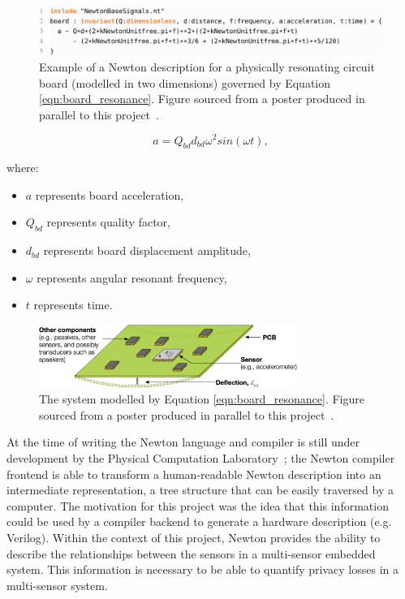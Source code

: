 \documentclass[12pt]{article}
\begin{document}
    \begin{figure}[H]
      \centering
      \includegraphics[width=\textwidth]{fig/newton_description.png}
      \caption{Example of a Newton description for a physically resonating circuit board (modelled in two dimensions) governed by Equation \ref{eqn:board_resonance}. Figure sourced from a poster produced in parallel to this project~\cite{eurosys_poster}.}
      \label{fig:newton_description}
    \end{figure}

    \begin{equation}
      a = Q_{bd} d_{bd} \omega^2sin(\omega t),
      \label{eqn:board_resonance}
    \end{equation}

    where:
    \begin{itemize}
      \item $a$ represents board acceleration,
      \item $Q_{bd}$ represents quality factor,
      \item $d_{bd}$ represents board displacement amplitude,
      \item $\omega$ represents angular resonant frequency,
      \item $t$ represents time.
    \end{itemize}

    \begin{figure}[H]
      \centering
      \includegraphics[width=0.75\textwidth]{fig/resonating_board.png}
      \caption{The system modelled by Equation \ref{eqn:board_resonance}. Figure sourced from a poster produced in parallel to this project~\cite{eurosys_poster}.}
      \label{fig:resonating_board}
    \end{figure}

    At the time of writing the Newton language and compiler is still under development by the Physical Computation Laboratory~\cite{physcomp}; the Newton compiler frontend is able to transform a human-readable Newton description into an intermediate representation, a tree structure that can be easily traversed by a computer. The motivation for this project was the idea that this information could be used by a compiler backend to generate a hardware description (e.g. Verilog). Within the context of this project, Newton provides the ability to describe the relationships between the sensors in a multi-sensor embedded system. This information is necessary to be able to quantify privacy losses in a multi-sensor system.
\end{document}
